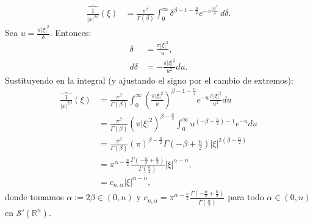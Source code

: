 \begin{homeworkProblem}
\begin{solution}
    \begin{align*}
      \hat{ \frac{1}{|x|^{2\beta}} }(\xi)
      &= \frac{\pi^\beta}{\Gamma(\beta)} \int_0^\infty \delta^{\beta - 1 - \frac{n}{2}} e^{-\pi \frac{|\xi|^2}{\delta}} \, d\delta.
    \end{align*}
    Sea $u = \frac{\pi |\xi|^2}{\delta}$. Entonces:
    \begin{align*}
      \delta &= \frac{\pi |\xi|^2}{u}, \\
      d\delta &= -\frac{\pi |\xi|^2}{u^2} du.
    \end{align*}
    Sustituyendo en la integral (y ajustando el signo por el cambio de extremos):
    \begin{align*}
      \hat{ \frac{1}{|x|^{2\beta}} }(\xi)
      &= \frac{\pi^\beta}{\Gamma(\beta)} \int_0^\infty \left(\frac{\pi |\xi|^2}{u}\right)^{\beta - 1 - \frac{n}{2}} e^{-u}  \frac{\pi |\xi|^2}{u^2} du \\
      &= \frac{\pi^\beta}{\Gamma(\beta)}  (\pi|\xi|^{2})^{\beta - \frac{n}{2}} \int_0^\infty u^{ (-\beta + \frac{n}{2})-1 } e^{-u} du \\
      &= \frac{\pi^\beta}{\Gamma(\beta)}(\pi)^{\beta-\frac{n}{2}}\Gamma(-\beta+\frac{n}{2})|\xi|^{2(\beta - \frac{n}{2})} \\
      &= \pi^{\alpha-\frac{n}{2}}\frac{\Gamma(-\frac{\alpha}{2}+\frac{n}{2})}{\Gamma(\frac{\alpha}{2})}|\xi|^{\alpha-n},\\
      &=c_{n,\alpha}|\xi|^{\alpha-n},
    \end{align*}
    donde tomamos $\alpha := 2\beta \in (0,n)$ y $c_{n,\alpha}=\pi^{\alpha-\frac{n}{2}}\frac{\Gamma(-\frac{\alpha}{2}+\frac{n}{2})}{\Gamma(\frac{\alpha}{2})}$ para todo $\alpha\in (0,n)$ en $\mathcal{S}'(\mathbb{R}^{n})$.
  \end{solution}
\end{homeworkProblem}
